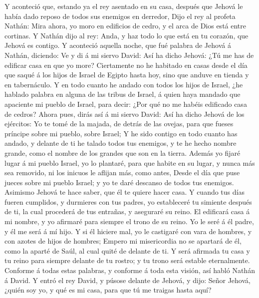  Y aconteció que, estando ya el rey asentado en su casa,
después que Jehová le había dado reposo de todos sus enemigos en
derredor,  Dijo el rey al profeta Nathán: Mira ahora, yo
moro en edificios de cedro, y el arca de Dios está entre cortinas.
 Y Nathán dijo al rey: Anda, y haz todo lo que está en tu
corazón, que Jehová es contigo.  Y aconteció aquella
noche, que fué palabra de Jehová á Nathán, diciendo:  Ve y
di á mi siervo David: Así ha dicho Jehová: ¿Tú me has de edificar casa
en que yo more?  Ciertamente no he habitado en casas desde
el día que saqué á los hijos de Israel de Egipto hasta hoy, sino que
anduve en tienda y en tabernáculo.  Y en todo cuanto he
andado con todos los hijos de Israel, ¿he hablado palabra en alguna de
las tribus de Israel, á quien haya mandado que apaciente mi pueblo de
Israel, para decir: ¿Por qué no me habéis edificado casa de cedros?
 Ahora pues, dirás así á mi siervo David: Así ha dicho
Jehová de los ejércitos: Yo te tomé de la majada, de detrás de las
ovejas, para que fueses príncipe sobre mi pueblo, sobre Israel;
 Y he sido contigo en todo cuanto has andado, y delante de
ti he talado todos tus enemigos, y te he hecho nombre grande, como el
nombre de los grandes que son en la tierra.  Además yo
fijaré lugar á mi pueblo Israel, yo lo plantaré, para que habite en su
lugar, y nunca más sea removido, ni los inicuos le aflijan más, como
antes,  Desde el día que puse jueces sobre mi pueblo
Israel; y yo te daré descanso de todos tus enemigos. Asimismo Jehová te
hace saber, que él te quiere hacer casa.  Y cuando tus
días fueren cumplidos, y durmieres con tus padres, yo estableceré tu
simiente después de ti, la cual procederá de tus entrañas, y aseguraré
su reino.  El edificará casa á mi nombre, y yo afirmaré
para siempre el trono de su reino.  Yo le seré á él
padre, y él me será á mí hijo. Y si él hiciere mal, yo le castigaré con
vara de hombres, y con azotes de hijos de hombres; 
Empero mi misericordia no se apartará de él, como la aparté de Saúl, al
cual quité de delante de ti.  Y será afirmada tu casa y
tu reino para siempre delante de tu rostro; y tu trono será estable
eternalmente.  Conforme á todas estas palabras, y
conforme á toda esta visión, así habló Nathán á David.  Y
entró el rey David, y púsose delante de Jehová, y dijo: Señor Jehová,
¿quién soy yo, y qué es mi casa, para que tú me traigas hasta aquí?

